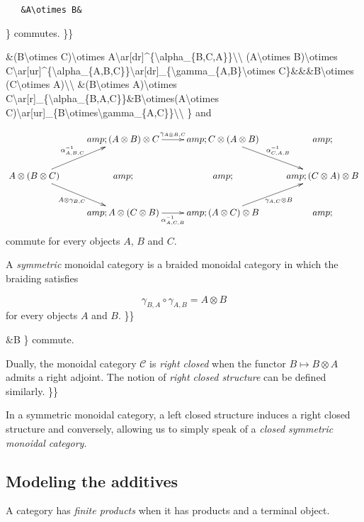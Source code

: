 \texttt{~~~\&A\textbackslash{}otimes~B\&}

\} commutes. \}\}

\&(B\textbackslash{}otimes C)\textbackslash{}otimes
A\textbackslash{}ar{[}dr{]}\^{}\{\textbackslash{}alpha\_\{B,C,A\}\}\textbackslash{}\textbackslash{}
(A\textbackslash{}otimes B)\textbackslash{}otimes
C\textbackslash{}ar{[}ur{]}\^{}\{\textbackslash{}alpha\_\{A,B,C\}\}\textbackslash{}ar{[}dr{]}\_\{\textbackslash{}gamma\_\{A,B\}\textbackslash{}otimes
C\}\&\&\&B\textbackslash{}otimes (C\textbackslash{}otimes
A)\textbackslash{}\textbackslash{} \&(B\textbackslash{}otimes
A)\textbackslash{}otimes
C\textbackslash{}ar{[}r{]}\_\{\textbackslash{}alpha\_\{B,A,C\}\}\&B\textbackslash{}otimes(A\textbackslash{}otimes
C)\textbackslash{}ar{[}ur{]}\_\{B\textbackslash{}otimes\textbackslash{}gamma\_\{A,C\}\}\textbackslash{}\textbackslash{}
\} and

\[\xymatrix{
&amp;(A\otimes B)\otimes C\ar[r]^{\gamma_{A\otimes B,C}}&amp;C\otimes (A\otimes B)\ar[dr]^{\alpha^{-1}_{C,A,B}}&amp;\\
A\otimes (B\otimes C)\ar[ur]^{\alpha^{-1}_{A,B,C}}\ar[dr]_{A\otimes\gamma_{B,C}}&amp;&amp;&amp;(C\otimes A)\otimes B\\
&amp;A\otimes(C\otimes B)\ar[r]_{\alpha^{-1}_{A,C,B}}&amp;(A\otimes C)\otimes B\ar[ur]_{\gamma_{A,C}\otimes B}&amp;\\
}\] commute for every objects \(A\), \(B\) and \(C\).

A \emph{symmetric} monoidal category is a braided monoidal category in
which the braiding satisfies

\[\gamma_{B,A}\circ\gamma_{A,B}=A\otimes B\] for every objects \(A\) and
\(B\). \}\}

\&B \} commute.

Dually, the monoidal category \(\mathcal{C}\) is \emph{right closed}
when the functor \(B\mapsto B\otimes A\) admits a right adjoint. The
notion of \emph{right closed structure} can be defined similarly. \}\}

In a symmetric monoidal category, a left closed structure induces a
right closed structure and conversely, allowing us to simply speak of a
\emph{closed symmetric monoidal category}.

\subsection{Modeling the additives}\label{modeling-the-additives}

A category has \emph{finite products} when it has products and a
terminal object.

